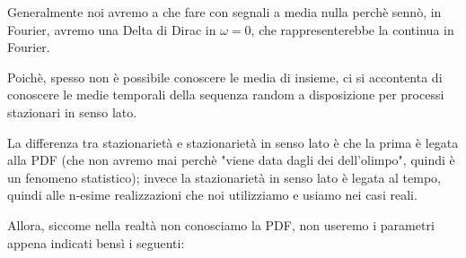 \begin{tcolorbox}
Generalmente noi avremo a che fare con segnali a media nulla perchè sennò, in Fourier, avremo una Delta di Dirac in $\omega = 0$, che rappresenterebbe la continua in Fourier.     
\end{tcolorbox}

Poichè, spesso non è possibile conoscere le media di insieme, ci si accontenta di conoscere le medie temporali della sequenza random a disposizione per processi stazionari in senso lato. \newline 

\begin{tcolorbox}
La differenza tra stazionarietà e stazionarietà in senso lato è che la prima è legata alla PDF (che non avremo mai perchè "viene data dagli dei dell'olimpo", quindi è un fenomeno statistico); 
invece la stazionarietà in senso lato è legata al tempo, quindi alle n-esime realizzazioni  che noi utilizziamo e usiamo nei casi reali.     
\end{tcolorbox}

Allora, siccome nella realtà non conosciamo la PDF, non useremo i parametri appena indicati bensì i seguenti: 

